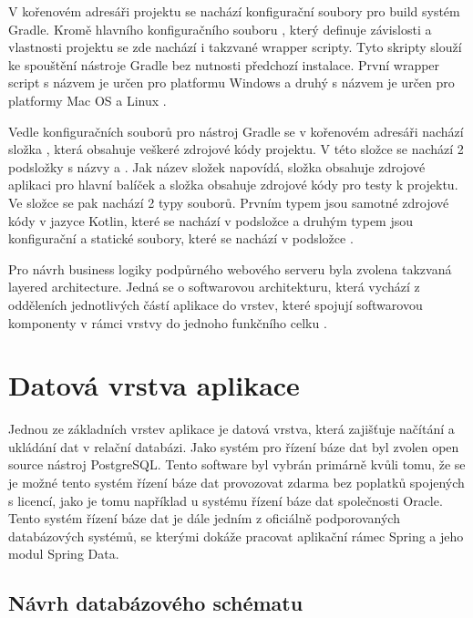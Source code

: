 V kořenovém adresáři projektu se nachází konfigurační soubory pro build systém Gradle. Kromě hlavního konfiguračního souboru , který definuje závislosti a vlastnosti projektu se zde nachází i takzvané wrapper scripty. Tyto skripty slouží ke spouštění nástroje Gradle bez nutnosti předchozí instalace. První wrapper script s názvem  je určen pro platformu Windows a druhý s názvem  je určen pro platformy Mac OS a Linux \cite[kap. 3.4]{muschko_gradle_2014}.

Vedle konfiguračních souborů pro nástroj Gradle se v kořenovém adresáři nachází složka , která obsahuje veškeré zdrojové kódy projektu. V této složce se nachází 2 podsložky s názvy  a . Jak název složek napovídá, složka  obsahuje zdrojové aplikaci pro hlavní balíček a složka  obsahuje zdrojové kódy pro testy k projektu. Ve složce  se pak nachází 2 typy souborů. Prvním typem jsou samotné zdrojové kódy v jazyce Kotlin, které se nachází v podsložce  a druhým typem jsou konfigurační a statické soubory, které se nachází v podsložce .

Pro návrh business logiky podpůrného webového serveru byla zvolena takzvaná layered architecture. Jedná se o softwarovou architekturu, která vychází z odděleních jednotlivých částí aplikace do vrstev, které spojují softwarovou komponenty v rámci vrstvy do jednoho funkčního celku \cite{richards_software_architecture_patterns_2015}.

\section{Datová vrstva aplikace}

Jednou ze základních vrstev aplikace je datová vrstva, která zajišťuje načítání a ukládání dat v relační databázi.
Jako systém pro řízení báze dat byl zvolen open source nástroj PostgreSQL. Tento software byl vybrán primárně kvůli tomu, že se je možné tento systém řízení báze dat provozovat zdarma bez poplatků spojených s licencí, jako je tomu například u systému řízení báze dat společnosti Oracle. Tento systém řízení báze dat je dále jedním z oficiálně podporovaných databázových systémů, se kterými dokáže pracovat aplikační rámec Spring a jeho modul Spring Data.

\subsection{Návrh databázového schématu}

